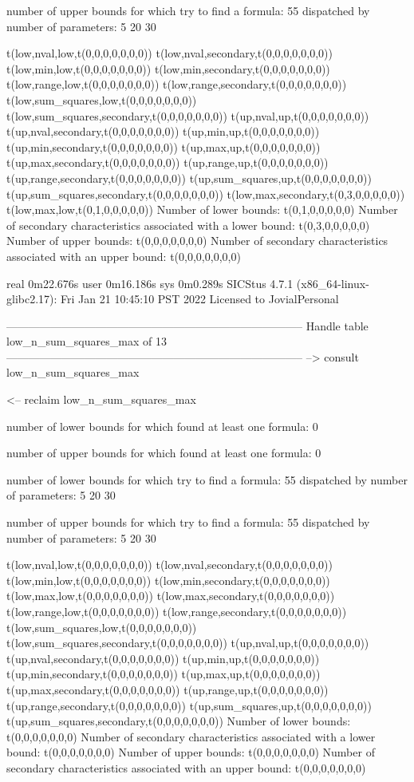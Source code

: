 number of upper bounds for which try to find a formula: 55
dispatched by number of parameters: 5  20  30

t(low,nval,low,t(0,0,0,0,0,0,0))
t(low,nval,secondary,t(0,0,0,0,0,0,0))
t(low,min,low,t(0,0,0,0,0,0,0))
t(low,min,secondary,t(0,0,0,0,0,0,0))
t(low,range,low,t(0,0,0,0,0,0,0))
t(low,range,secondary,t(0,0,0,0,0,0,0))
t(low,sum_squares,low,t(0,0,0,0,0,0,0))
t(low,sum_squares,secondary,t(0,0,0,0,0,0,0))
t(up,nval,up,t(0,0,0,0,0,0,0))
t(up,nval,secondary,t(0,0,0,0,0,0,0))
t(up,min,up,t(0,0,0,0,0,0,0))
t(up,min,secondary,t(0,0,0,0,0,0,0))
t(up,max,up,t(0,0,0,0,0,0,0))
t(up,max,secondary,t(0,0,0,0,0,0,0))
t(up,range,up,t(0,0,0,0,0,0,0))
t(up,range,secondary,t(0,0,0,0,0,0,0))
t(up,sum_squares,up,t(0,0,0,0,0,0,0))
t(up,sum_squares,secondary,t(0,0,0,0,0,0,0))
t(low,max,secondary,t(0,3,0,0,0,0,0))
t(low,max,low,t(0,1,0,0,0,0,0))
Number of lower bounds:                                             t(0,1,0,0,0,0,0)
Number of secondary characteristics associated with a lower bound:  t(0,3,0,0,0,0,0)
Number of upper bounds:                                             t(0,0,0,0,0,0,0)
Number of secondary characteristics associated with an upper bound: t(0,0,0,0,0,0,0)

real	0m22.676s
user	0m16.186s
sys	0m0.289s
SICStus 4.7.1 (x86_64-linux-glibc2.17): Fri Jan 21 10:45:10 PST 2022
Licensed to JovialPersonal


--------------------------------------------------------------------------------
Handle table low_n_sum_squares_max of 13
--------------------------------------------------------------------------------
--> consult low_n_sum_squares_max

<-- reclaim low_n_sum_squares_max

number of lower bounds for which found at least one formula: 0

number of upper bounds for which found at least one formula: 0

number of lower bounds for which try to find a formula: 55
dispatched by number of parameters: 5  20  30

number of upper bounds for which try to find a formula: 55
dispatched by number of parameters: 5  20  30

t(low,nval,low,t(0,0,0,0,0,0,0))
t(low,nval,secondary,t(0,0,0,0,0,0,0))
t(low,min,low,t(0,0,0,0,0,0,0))
t(low,min,secondary,t(0,0,0,0,0,0,0))
t(low,max,low,t(0,0,0,0,0,0,0))
t(low,max,secondary,t(0,0,0,0,0,0,0))
t(low,range,low,t(0,0,0,0,0,0,0))
t(low,range,secondary,t(0,0,0,0,0,0,0))
t(low,sum_squares,low,t(0,0,0,0,0,0,0))
t(low,sum_squares,secondary,t(0,0,0,0,0,0,0))
t(up,nval,up,t(0,0,0,0,0,0,0))
t(up,nval,secondary,t(0,0,0,0,0,0,0))
t(up,min,up,t(0,0,0,0,0,0,0))
t(up,min,secondary,t(0,0,0,0,0,0,0))
t(up,max,up,t(0,0,0,0,0,0,0))
t(up,max,secondary,t(0,0,0,0,0,0,0))
t(up,range,up,t(0,0,0,0,0,0,0))
t(up,range,secondary,t(0,0,0,0,0,0,0))
t(up,sum_squares,up,t(0,0,0,0,0,0,0))
t(up,sum_squares,secondary,t(0,0,0,0,0,0,0))
Number of lower bounds:                                             t(0,0,0,0,0,0,0)
Number of secondary characteristics associated with a lower bound:  t(0,0,0,0,0,0,0)
Number of upper bounds:                                             t(0,0,0,0,0,0,0)
Number of secondary characteristics associated with an upper bound: t(0,0,0,0,0,0,0)

